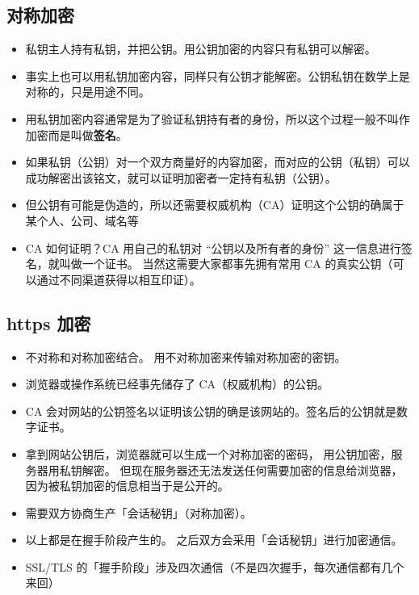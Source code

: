 
\subsection{对称加密}
\begin{itemize}
\item 私钥主人持有私钥，并把公钥。用公钥加密的内容只有私钥可以解密。
\item 事实上也可以用私钥加密内容，同样只有公钥才能解密。公钥私钥在数学上是对称的，只是用途不同。
\item 用私钥加密内容通常是为了验证私钥持有者的身份，所以这个过程一般不叫作加密而是叫做\textbf{签名}。
\item 如果私钥（公钥）对一个双方商量好的内容加密，而对应的公钥（私钥）可以成功解密出该铭文，就可以证明加密者一定持有私钥（公钥）。
\item 但公钥有可能是伪造的，所以还需要权威机构（CA）证明这个公钥的确属于某个人、公司、域名等
\item CA 如何证明？CA 用自己的私钥对 “公钥以及所有者的身份” 这一信息进行签名，就叫做一个证书。 当然这需要大家都事先拥有常用 CA 的真实公钥（可以通过不同渠道获得以相互印证）。
\end{itemize}

\subsection{https 加密}
\begin{itemize}
\item 不对称和对称加密结合。 用不对称加密来传输对称加密的密钥。
\item 浏览器或操作系统已经事先储存了 CA（权威机构）的公钥。
\item CA 会对网站的公钥签名以证明该公钥的确是该网站的。签名后的公钥就是数字证书。
\item 拿到网站公钥后，浏览器就可以生成一个对称加密的密码， 用公钥加密，服务器用私钥解密。 但现在服务器还无法发送任何需要加密的信息给浏览器，因为被私钥加密的信息相当于是公开的。
\item 需要双方协商生产「会话秘钥」（对称加密）。
\item 以上都是在握手阶段产生的。 之后双方会采用「会话秘钥」进行加密通信。
\item SSL/TLS 的「握手阶段」涉及四次通信（不是四次握手，每次通信都有几个来回）
\end{itemize}
